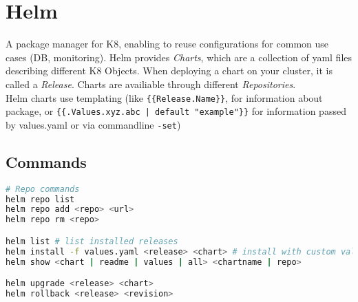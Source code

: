 \section{Helm}
A package manager for K8, enabling to reuse configurations for common use cases (DB, monitoring). Helm provides \textit{Charts}, which are a collection of yaml files describing different K8 Objects. When deploying a chart on your cluster, it is called a \textit{Release}. Charts are availiable through different \textit{Repositories}. \\
Helm charts use templating (like \texttt{\{\{Release.Name\}\}}, for information about package, or \texttt{\{\{.Values.xyz.abc | default "example"\}\}} for information passed by values.yaml or via commandline \texttt{-set})

\subsection{Commands}

\begin{lstlisting}[language=sh]
# Repo commands
helm repo list
helm repo add <repo> <url>
helm repo rm <repo>

helm list # list installed releases
helm install -f values.yaml <release> <chart> # install with custom values
helm show <chart | readme | values | all> <chartname | repo>

helm upgrade <release> <chart>
helm rollback <release> <revision>

\end{lstlisting}
